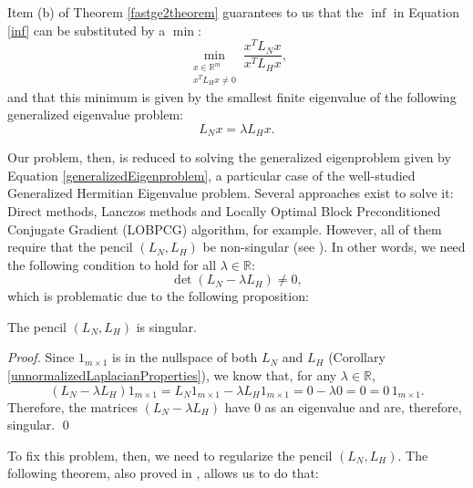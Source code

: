 Item (b) of Theorem \vref{fastge2theorem} guarantees to us that the $\inf$ in Equation \vref{inf} can be substituted by a $\min$:
\begin{equation}\label{min}
   \min_{\substack{x \in \mathbb R^m \\ x^T L_H x \ne 0}} \frac{x^T L_N x}{x^T L_H x},
\end{equation}
and that this minimum is given by the smallest finite eigenvalue of the following generalized eigenvalue problem:
\begin{equation}\label{generalizedEigenproblem}
   L_N x = \lambda L_H x.
\end{equation}

Our problem, then, is reduced to solving the generalized eigenproblem given by Equation \vref{generalizedEigenproblem}, a particular case of the well-studied Generalized Hermitian Eigenvalue problem.
Several approaches exist to solve it: Direct methods, Lanczos methods and Locally Optimal Block Preconditioned Conjugate Gradient (LOBPCG) algorithm, for example. 
However, all of them require that the pencil $(L_N, L_H)$ be non-singular (see \cite{templates}).
In other words, we need the following condition to hold for all $\lambda \in \mathbb R$:
\begin{equation}
   \det (L_N - \lambda L_H) \ne 0,
\end{equation}
which is problematic due to the following proposition:

\begin{proposition} \label{huesing}
   The pencil $(L_N, L_H)$ is singular.
\end{proposition}

\begin{proof}
   Since $1_{m \times 1}$ is in the nullspace of both $L_N$ and $L_H$ (Corollary \vref{unnormalizedLaplacianProperties}), we know that, for any $\lambda \in \mathbb R$,
   \begin{equation*}
      (L_N - \lambda L_H) 1_{m \times 1} = L_N 1_{m \times 1} - \lambda L_H 1_{m \times 1} = 0 - \lambda 0 = 0 = 0 \, 1_{m \times 1}.
   \end{equation*}
   Therefore, the matrices $(L_N - \lambda L_H)$ have $0$ as an eigenvalue and are, therefore, singular. \qed
\end{proof}

To fix this problem, then, we need to regularize the pencil $(L_N, L_H)$.
The following theorem, also proved in \cite{fastge2}, allows us to do that:

